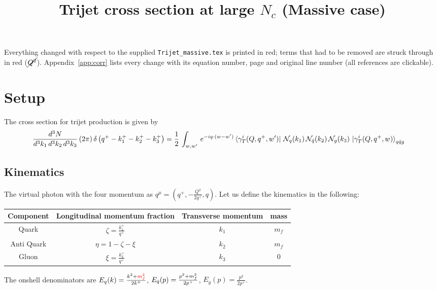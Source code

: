 \documentclass[9pt]{article}
\title{Trijet cross section at large $N_{c}$ (Massive case)}
\author{}
\date{}
\newcommand{\chg}[1]{{\color{red}#1}}
\numberwithin{equation}{section}
\begin{document}
\maketitle
{} Everything changed with respect to the supplied \texttt{Trijet\_massive.tex} is printed in {\color{red}red}; terms that had to be removed are struck through in red ({\color{red}$\cancel{Q^{2}}$}). Appendix~\ref{app:corr} lists every change with its equation number, page and original line number (all references are clickable).
\section{Setup}
The cross section for trijet production is given by
\begin{align}
    \frac{d^{3}N}{d^{3}k_{1}\,d^{3}k_{2}\, d^{3}k_{3}}\, (2\pi)\,\delta\left(q^{+}-k^{+}_{1}-k^{+}_{2}-k^{+}_{3}\right) & =  \frac{1}{2}\,\int_{w,w'}\, e^{-iq\cdot (w-w')} 
\bra{\gamma^{i}_{T}(Q,q^{+},w')}\,\mathcal{N}_{q}(k_{1})\,\mathcal{N}_{\Bar{q}}(k_{2})\,\mathcal{N}_{g}(k_{3})\,\ket{\gamma^{i}_{T}(Q,q^{+},w)}_{q\Bar{q}g}
\end{align}
\subsection{Kinematics}
The virtual photon with the four momentum as $q^{\mu} = \left(q^{+},-\frac{Q^{2}}{2q^{+}},q\right)$. Let us define the kinematics in the following:
\begin{table}[h!]
\centering
\begin{tabular}{||c c c c||} 
 \hline
 Component & Longitudinal momentum fraction & Transverse momentum & mass \\ [0.5ex] 
 \hline\hline
 Quark & $\zeta = \frac{k^{+}_{1}}{q^{+}}$  & $k_{1}$ & $m_{f}$ \\ 
 Anti Quark & $\eta = 1-\zeta-\xi$  &  $k_{2}$ & $m_{f}$ \\
 Gluon & $\xi = \frac{k^{+}_{3}}{q^{+}}$ & $k_{3}$ & $0$ \\
 \hline
\end{tabular}
\label{table:1}
\end{table}
The onshell denominators are $\label{chg:Eq}E_{q}(k) = \frac{k^{2}+\chg{m^{2}_{f}}}{2k^{+}}$, $E_{\Bar{q}}(p) = \frac{p^{2}+m_{f}^{2}}{2p^{+}}$, $E_{g}(p) = \frac{p^{2}}{2p^{+}}$.  
\end{document}
